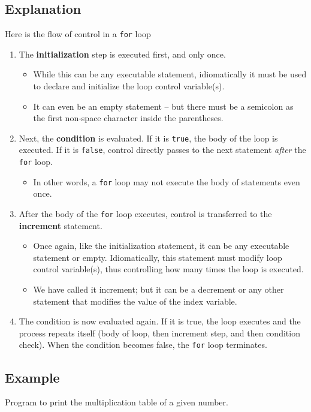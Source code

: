 \documentclass[11pt,a4paper]{article}
\begin{document}
\subsection*{Explanation} 
Here is the flow of control in a \lstinline!for! loop
\begin{enumerate}
\item The \textbf{initialization} step is executed first, and only once. 
  \begin{itemize}
  \item While this can be any executable statement, idiomatically it must be used to declare and initialize the loop control variable(s). 
  \item It can even be an empty statement -- but there must be a semicolon as the first non-space character inside the parentheses.
  \end{itemize}
\item Next, the \textbf{condition} is evaluated. If it is \texttt{true}, the body of the loop is executed. If it is \texttt{false}, control directly passes to the next statement \emph{after} the \lstinline!for! loop.
\begin{itemize}
  \item In other words, a \lstinline!for! loop may not execute the body of statements even once.
\end{itemize}
\item After the body of the \lstinline!for! loop executes, control is transferred to the \textbf{increment} statement. 
\begin{itemize}
  \item Once again, like the initialization statement, it can be any executable statement or empty. Idiomatically, this  statement must modify loop control variable(s), thus controlling how many times the loop is executed.
    \item We have called it increment; but it can be a decrement or any other statement that modifies the value of the index variable.
\end{itemize}
\item The condition is now evaluated again. If it is true, the loop executes and the process repeats itself (body of loop, then increment step, and then  condition check). When the condition becomes false, the \lstinline!for! loop terminates.
\end{enumerate}

\subsection*{Example}
Program to print the multiplication table of a given number.

\end{document}
